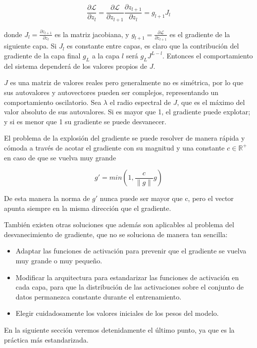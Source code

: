 $$\frac{\partial \mathcal{L}}{\partial z_l} = \frac{\partial \mathcal{L}}{\partial z_{l+1}} \frac{\partial z_{l+1}}{\partial z_l} = g_{l+1} J_l$$

donde $J_l = \frac{\partial z_{l+1}}{\partial z_l}$ es la matriz jacobiana, y $g_{l+1} = \frac{\partial \mathcal{L}}{\partial z_{l+1}}$ es el gradiente de la siguiente capa. Si $J_l$ es constante entre capas, es claro que la contribución del gradiente de la capa final $g_L$ a la capa $l$ será $ g_L J^{L-l}$. Entonces el comportamiento del sistema dependerá de los valores propios de $J$. %

$J$ es una matriz de valores reales pero generalmente no es simétrica, por lo que sus autovalores y autovectores pueden ser complejos, representando un comportamiento oscilatorio. Sea $\lambda$ el radio espectral de $J$, que es el máximo del valor absoluto de sus autovalores. Si es mayor que 1, el gradiente puede explotar; y si es menor que 1 su gradiente se puede desvanecer. 

El problema de la explosión del gradiente se puede resolver de manera rápida y cómoda a través de acotar el gradiente con su magnitud y una constante $c \in \mathbb{R}^+$ en caso de que se vuelva muy grande

$$g' = min(1, \frac{c}{\|g\|}g)$$

De esta manera la norma de $g'$ nunca puede ser mayor que c, pero el vector apunta siempre en la misma dirección que el gradiente.

También existen otras soluciones que además son aplicables al problema del desvanecimiento de gradiente, que no se soluciona de manera tan sencilla:

\begin{itemize}
    \item Adaptar las funciones de activación para prevenir que el gradiente se vuelva muy grande o muy pequeño.

    \item Modificar la arquitectura para estandarizar las funciones de activación en cada capa, para que la distribución de las activaciones sobre el conjunto de datos permanezca constante durante el entrenamiento.

    \item Elegir cuidadosamente los valores iniciales de los pesos del modelo.
   
\end{itemize}

En la siguiente sección veremos detenidamente el último punto, ya que es la práctica más estandarizada. 


